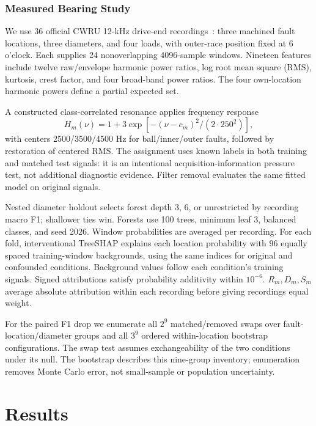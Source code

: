 \documentclass[conference]{IEEEtran}
\begin{document}
\subsubsection{Measured Bearing Study}
We use 36 official CWRU 12-kHz drive-end recordings~\cite{cwru2026}: three machined fault locations, three diameters, and four loads, with outer-race position fixed at 6 o'clock. Each supplies 24 nonoverlapping 4096-sample windows. Nineteen features include twelve raw/envelope harmonic power ratios, log root mean square (RMS), kurtosis, crest factor, and four broad-band power ratios. The four own-location harmonic powers define a partial expected set.

A constructed class-correlated resonance applies frequency response
\begin{equation}
 H_m(\nu)=1+3\exp[-(\nu-c_m)^2/(2\cdot250^2)],
\end{equation}
with centers 2500/3500/4500 Hz for ball/inner/outer faults, followed by restoration of centered RMS. The assignment uses known labels in both training and matched test signals: it is an intentional acquisition-information pressure test, not additional diagnostic evidence. Filter removal evaluates the same fitted model on original signals.

Nested diameter holdout selects forest depth 3, 6, or unrestricted by recording macro F1; shallower ties win. Forests use 100 trees, minimum leaf 3, balanced classes, and seed 2026. Window probabilities are averaged per recording. For each fold, interventional TreeSHAP explains each location probability with 96 equally spaced training-window backgrounds, using the same indices for original and confounded conditions. Background values follow each condition's training signals. Signed attributions satisfy probability additivity within $10^{-6}$. $R_m,D_m,S_m$ average absolute attribution within each recording before giving recordings equal weight.

For the paired F1 drop we enumerate all $2^9$ matched/removed swaps over fault-location/diameter groups and all $3^9$ ordered within-location bootstrap configurations. The swap test assumes exchangeability of the two conditions under its null. The bootstrap describes this nine-group inventory; enumeration removes Monte Carlo error, not small-sample or population uncertainty.

\section{Results}
\label{sec:results}
\end{document}
